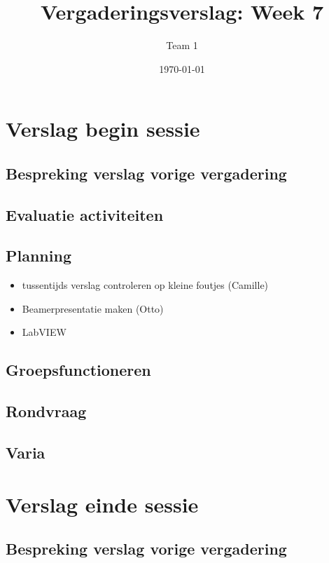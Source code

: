 \documentclass[a4paper,kulak]{kulakarticle} %
\date{\today}
\title{Vergaderingsverslag: Week 7}
\author{Team 1}
\begin{document}
\maketitle

\section{Verslag begin sessie}

\subsection{Bespreking verslag vorige vergadering}

\subsection{Evaluatie activiteiten}

\subsection{Planning}
\begin{itemize}
	\item tussentijds verslag controleren op kleine foutjes (Camille)
	\item Beamerpresentatie maken (Otto)
	\item LabVIEW
	
\end{itemize}

\subsection{Groepsfunctioneren}

\subsection{Rondvraag}

\subsection{Varia}




\section{Verslag einde sessie}

\subsection{Bespreking verslag vorige vergadering}
\end{document}
